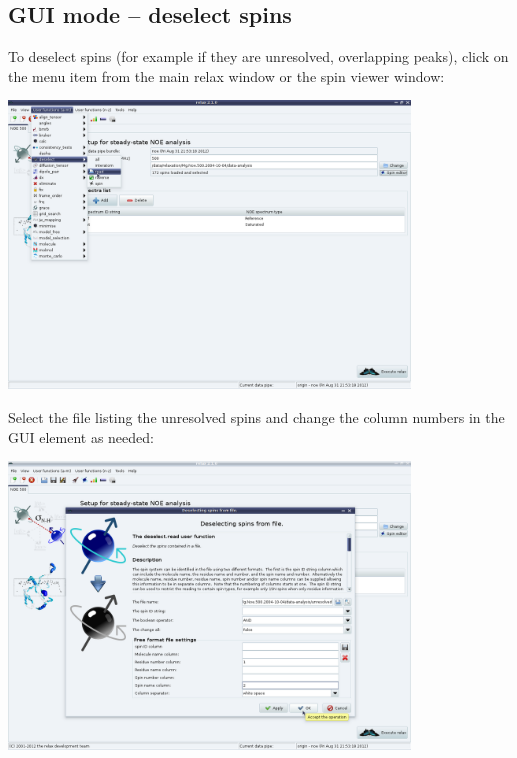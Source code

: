 
\subsection{GUI mode -- deselect spins} \label{sect: GUI - deselect spins}

To deselect spins (for example if they are unresolved, overlapping peaks), click on the  menu item from the main relax window or the spin viewer window:

\begin{minipage}[h]{\linewidth}
\centerline{\includegraphics[width=0.8\textwidth, bb=14 14 1415 1019]{graphics/screenshots/noe_analysis/analysis_tab3}}
\end{minipage}

Select the file listing the unresolved spins and change the column numbers in the  GUI element as needed: 

\begin{minipage}[h]{\linewidth}
\centerline{\includegraphics[width=0.8\textwidth, bb=14 14 1415 1019]{graphics/screenshots/noe_analysis/deselect}}
\end{minipage}

